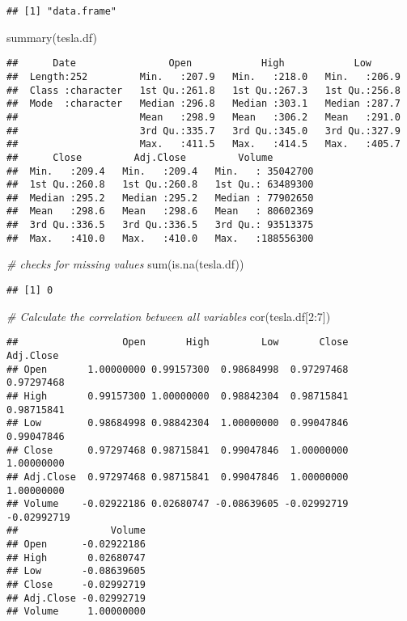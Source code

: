 \documentclass[
]{article}
\newenvironment{Shaded}{\begin{snugshade}}{\end{snugshade}}
\newcommand{\CommentTok}[1]{\textcolor[rgb]{0.56,0.35,0.01}{\textit{#1}}}
\newcommand{\DecValTok}[1]{\textcolor[rgb]{0.00,0.00,0.81}{#1}}
\newcommand{\FunctionTok}[1]{\textcolor[rgb]{0.00,0.00,0.00}{#1}}
\newcommand{\NormalTok}[1]{#1}
\newcommand{\SpecialCharTok}[1]{\textcolor[rgb]{0.00,0.00,0.00}{#1}}
\begin{document}
\begin{verbatim}
## [1] "data.frame"
\end{verbatim}

\begin{Shaded}
\begin{Highlighting}[]
\FunctionTok{summary}\NormalTok{(tesla.df)}
\end{Highlighting}
\end{Shaded}

\begin{verbatim}
##      Date                Open            High            Low       
##  Length:252         Min.   :207.9   Min.   :218.0   Min.   :206.9  
##  Class :character   1st Qu.:261.8   1st Qu.:267.3   1st Qu.:256.8  
##  Mode  :character   Median :296.8   Median :303.1   Median :287.7  
##                     Mean   :298.9   Mean   :306.2   Mean   :291.0  
##                     3rd Qu.:335.7   3rd Qu.:345.0   3rd Qu.:327.9  
##                     Max.   :411.5   Max.   :414.5   Max.   :405.7  
##      Close         Adj.Close         Volume         
##  Min.   :209.4   Min.   :209.4   Min.   : 35042700  
##  1st Qu.:260.8   1st Qu.:260.8   1st Qu.: 63489300  
##  Median :295.2   Median :295.2   Median : 77902650  
##  Mean   :298.6   Mean   :298.6   Mean   : 80602369  
##  3rd Qu.:336.5   3rd Qu.:336.5   3rd Qu.: 93513375  
##  Max.   :410.0   Max.   :410.0   Max.   :188556300
\end{verbatim}

\begin{Shaded}
\begin{Highlighting}[]
\CommentTok{\# checks for missing values}
\FunctionTok{sum}\NormalTok{(}\FunctionTok{is.na}\NormalTok{(tesla.df))}
\end{Highlighting}
\end{Shaded}

\begin{verbatim}
## [1] 0
\end{verbatim}

\begin{Shaded}
\begin{Highlighting}[]
\CommentTok{\# Calculate the correlation between all variables}
\FunctionTok{cor}\NormalTok{(tesla.df[}\DecValTok{2}\SpecialCharTok{:}\DecValTok{7}\NormalTok{])}
\end{Highlighting}
\end{Shaded}

\begin{verbatim}
##                  Open       High         Low       Close   Adj.Close
## Open       1.00000000 0.99157300  0.98684998  0.97297468  0.97297468
## High       0.99157300 1.00000000  0.98842304  0.98715841  0.98715841
## Low        0.98684998 0.98842304  1.00000000  0.99047846  0.99047846
## Close      0.97297468 0.98715841  0.99047846  1.00000000  1.00000000
## Adj.Close  0.97297468 0.98715841  0.99047846  1.00000000  1.00000000
## Volume    -0.02922186 0.02680747 -0.08639605 -0.02992719 -0.02992719
##                Volume
## Open      -0.02922186
## High       0.02680747
## Low       -0.08639605
## Close     -0.02992719
## Adj.Close -0.02992719
## Volume     1.00000000
\end{verbatim}
\end{document}

